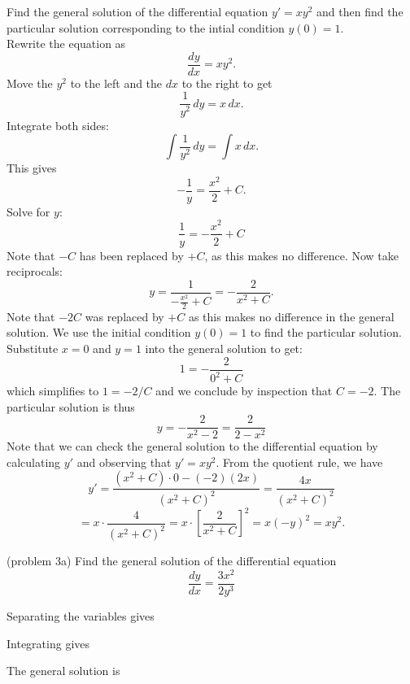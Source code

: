 \documentclass[handout]{ximera}
\begin{document}
\begin{example}[example 3]
Find the general solution of the differential equation $y' = xy^2$ and then find the particular solution corresponding to the intial condition $y(0) = 1$.\\
Rewrite the equation as 
\[
\frac{dy}{dx} = xy^2.
\]
Move the $y^2$ to the left and the $dx$ to the right to get
\[
\frac{1}{y^2} \, dy = x \,  dx.
\]
Integrate both sides:
\[
\int \frac{1}{y^2}\,  dy  = \int x \, dx.
\]
This gives
\[
-\frac{1}{y} = \frac{x^2}{2} + C.
\]
Solve for $y$:
\[
\frac{1}{y} = -\frac{x^2}{2} + C
\]
Note that $-C$ has been replaced by $+C$, as this makes no difference. Now take reciprocals:
\[
y = \frac{1}{-\frac{x^2}{2} + C} = - \frac{2}{x^2 + C}.
\]
Note that $-2C$ was replaced by $+C$ as this makes no difference in the general solution.
We use the initial condition $y(0) = 1$ to find the particular solution. Substitute $x= 0$ and $y = 1$ into the general solution to get:
\[
1 = -\frac{2}{0^2 + C}
\]
which simplifies to $1 = -2/C$ and we conclude by inspection that $C = -2$.
The particular solution is thus
\[
y = - \frac{2}{x^2 -2}  = \frac{2}{2-x^2}
\]
Note that we can check the general solution to the differential equation by 
calculating $y'$ and observing that $y' = xy^2$.
From the quotient rule, we have
\[
y' = \frac{(x^2 + C)\cdot 0 - (-2)(2x)}{(x^2 + C)^2} = \frac{4x}{(x^2 + C)^2} 
\]
\[
= x \cdot \frac{4}{(x^2 + C)^2} = x \cdot \left[\frac{2}{x^2 + C}\right]^2 = x(-y)^2 = xy^2.
\]



\end{example}


\begin{problem}(problem 3a)
Find the general solution of the differential equation
\[
\frac{dy}{dx} = \frac{3x^2}{2y^3}
\]

Separating the variables gives

\begin{multipleChoice}
\end{multipleChoice}

Integrating gives

\begin{multipleChoice}
\end{multipleChoice}

The general solution is

\begin{multipleChoice}
\end{multipleChoice}

\end{problem}
\end{document}
